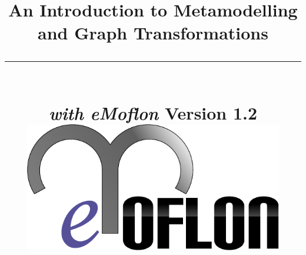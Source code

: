 \title{
\flushright
{\LARGE\bfseries An Introduction to Metamodelling\\
and Graph Transformations}
\noindent\rule[-1ex]{\textwidth}{5pt}\\[2.5ex]
\hfill\emph{\LARGE\bfseries with eMoflon}
\flushleft
{\small Version 1.2}
\flushright
\includegraphics[width=0.85\textwidth]{pics/eMoflon3} 
}

\date{}  
\author{} 